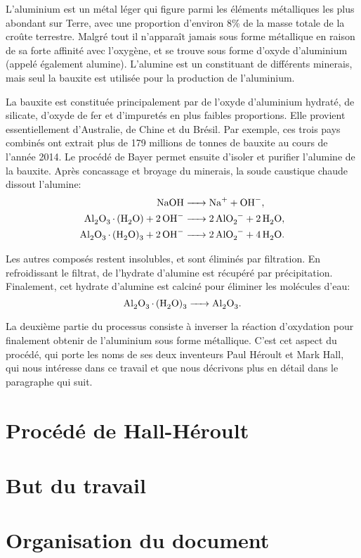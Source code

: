L'aluminium est un métal léger qui figure parmi les éléments
métalliques les plus abondant sur Terre, avec une proportion d'environ
\num{8}\% de la masse totale de la croûte terrestre. Malgré tout il
n'apparaît jamais sous forme métallique en raison de sa forte affinité
avec l'oxygène, et se trouve sous forme d'oxyde d'aluminium 
(appelé également alumine). L'alumine est un constituant de différents
minerais, mais seul la bauxite est utilisée pour la production de
l'aluminium.

La bauxite est constituée principalement par de l'oxyde d'aluminium
hydraté, de silicate, d'oxyde de fer et d'impuretés en plus faibles
proportions. Elle provient essentiellement d'Australie, de Chine et du
Brésil. Par exemple, ces trois pays combinés ont extrait plus de
\num{179} millions de tonnes de bauxite au cours de l'année
\num{2014}. Le procédé de Bayer permet ensuite d'isoler et purifier
l'alumine de la bauxite. Après concassage et broyage du minerais, la
soude caustique chaude dissout l'alumine:
\begin{align*}
  \cee{NaOH &-> Na+ + OH-},\\
  \cee{Al2O3.(H2O) + 2OH- &-> 2AlO2- + 2H2O},\\
  \cee{Al2O3.(H2O)3 + 2OH- &-> 2AlO2- + 4H2O}.
\end{align*}

Les autres composés restent insolubles, et sont éliminés par
filtration. En refroidissant le filtrat, de l'hydrate d'alumine est
récupéré par précipitation. Finalement, cet hydrate d'alumine est
calciné pour éliminer les molécules d'eau:
\begin{equation*}
  \cee{Al2O3.(H2O)3 -> Al2O3}.
\end{equation*}

La deuxième partie du processus consiste à inverser la réaction
d'oxydation pour finalement obtenir de l'aluminium sous forme
métallique. C'est cet aspect du procédé, qui porte les noms de ses
deux inventeurs Paul Héroult et Mark Hall, qui nous intéresse dans
ce travail et que nous décrivons plus en détail dans le paragraphe
qui suit.


\section{Procédé de Hall-Héroult}
\label{sec:introduction-hall-heroult}



\section{But du travail}
\label{sec:introduction-aims}



\section{Organisation du document}
\label{sec:introduction-organisation}

